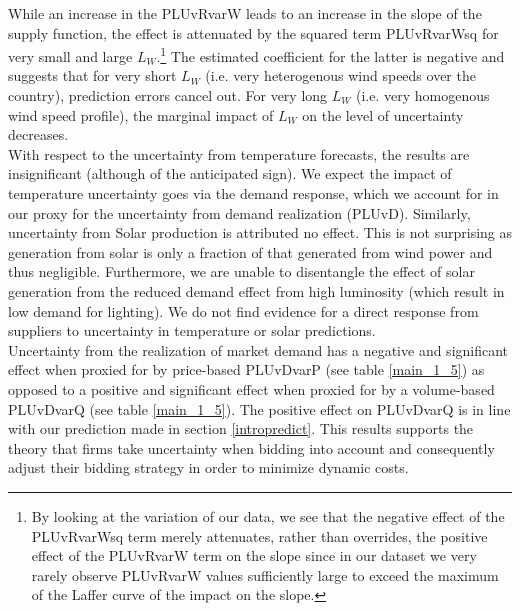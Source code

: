 While an increase in the PLUvRvarW leads to an increase in the slope of the supply function, the effect is attenuated by the squared term PLUvRvarWsq 
for very small and large $L_W$.\footnote{By looking at the variation of our data, we see that the negative effect of the PLUvRvarWsq term merely attenuates, rather than overrides, the positive effect of the PLUvRvarW term on the slope since in our dataset we very rarely observe PLUvRvarW values sufficiently large to exceed the maximum of the Laffer curve of the impact on the slope.} The estimated coefficient for the latter is negative and suggests that for very short $L_W$ (i.e. very heterogenous wind speeds over the country), prediction errors cancel out. For very long $L_W$ (i.e. very homogenous wind speed profile), the marginal impact of $L_W$ on the level of uncertainty decreases. \\


With respect to the uncertainty from temperature forecasts, the results are insignificant (although of the anticipated sign). We expect the impact of temperature uncertainty goes via the demand response, which we account for in our proxy for the uncertainty from demand realization (PLUvD). Similarly, uncertainty from Solar production is attributed no effect. This is not surprising as 
generation from solar is only a fraction of that generated from wind power and thus negligible.
Furthermore, we are unable to disentangle the effect of solar generation from the reduced demand effect from high luminosity (which result in low demand for lighting). We do not find evidence for a direct response from suppliers to uncertainty in temperature or solar predictions. \\

Uncertainty from the realization of market demand has a negative and significant effect when proxied for by price-based PLUvDvarP (see table \ref{main_1_5}) as opposed to a positive and significant effect when proxied for by a volume-based PLUvDvarQ (see table \ref{main_1_5}). 
The positive effect on PLUvDvarQ is in line with our prediction made in section \ref{intropredict}. This results supports the theory that firms take uncertainty when bidding into account and consequently adjust their bidding strategy in order to minimize dynamic costs. \\

